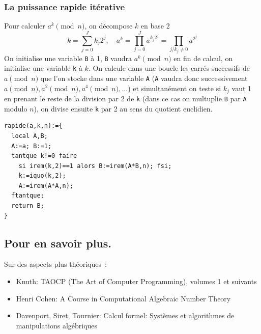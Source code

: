 \documentclass[a4paper,11pt]{article}
\begin{document}
\subsubsection{La puissance rapide it\'erative}
Pour calculer $a^k \pmod n$, on d\'ecompose $k$ en base 2
$$ k=\sum_{j=0}^J k_j 2^j, \quad a^k = \prod_{j=0}^{J} a^{k_j 2^j} 
= \prod_{j/k_j \neq 0} a^{2^j} $$
On initialise une variable \verb|B| \`a 1, \verb|B| vaudra $a^k \pmod
n$ en fin de calcul, on initialise une variable \verb|k| \`a $k$.
On calcule dans une boucle les carr\'es successifs de $a
\pmod n$ que l'on stocke dans une variable \verb|A| (\verb|A| 
vaudra donc successivement $a \pmod n, a^2 \pmod n, a^{4} \pmod n,
...$) et simultan\'ement on teste si $k_j$ vaut 1 en prenant le reste de la
division par 2 de \verb|k| (dans ce cas on multuplie \verb|B| par
\verb|A| modulo $n$), on divise ensuite \verb|k| par 2  au sens du quotient
euclidien.
\begin{verbatim}
rapide(a,k,n):={
  local A,B;
  A:=a; B:=1;
  tantque k!=0 faire
    si irem(k,2)==1 alors B:=irem(A*B,n); fsi;
    k:=iquo(k,2);
    A:=irem(A*A,n);
  ftantque;
  return B;
}
\end{verbatim}


\subsection{Pour en savoir plus.}
Sur des aspects plus th\'eoriques~:
\begin{itemize}
\item Knuth: TAOCP (The Art of Computer Programming), volumes 1 et suivants
\item Henri Cohen: A Course in Computational Algebraic Number Theory
\item Davenport, Siret, Tournier: Calcul formel: Syst\`emes et algorithmes 
de manipulations  alg\'ebriques
\end{itemize}
\end{document}
